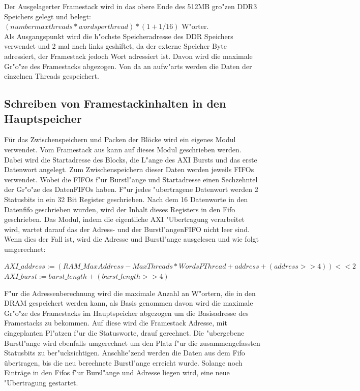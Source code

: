 Der Ausgelagerter Framestack wird in das obere Ende des 512MB gro"zen DDR3 Speichers gelegt und belegt:\\ $(number max threads * words per thread)*(1+1/16) $ W"orter.\\
Als Ausgangspunkt wird die h"ochste Speicheradresse des DDR Speichers verwendet und 2 mal nach links geshiftet, da der externe Speicher Byte adressiert, der Framestack jedoch Wort adressiert ist. Davon wird die maximale Gr"o"ze des Framestacks abgezogen. Von da an aufw"arts werden die Daten der einzelnen Threads gespeichert.

\subsection{Schreiben von Framestackinhalten in den Hauptspeicher}
F\"ur das Zwischenspeichern und Packen der Bl\"ocke wird ein eigenes Modul verwendet.
Vom Framestack aus kann auf dieses Modul geschrieben werden. Dabei wird die Startadresse des Blocks, die L"ange des AXI Bursts und das erste Datenwort angelegt. Zum Zwischenspeichern dieser Daten werden jeweils FIFOs verwendet. Wobei die FIFOs f"ur Burstl"ange und Startadresse einen Sechzehntel der Gr"o{"z}e des DatenFIFOs haben. F"ur jedes "ubertragene Datenwort werden 2 Statusbits in ein 32 Bit Register geschrieben. Nach dem 16 Datenworte in den Datenfifo geschrieben wurden, wird der Inhalt dieses Registers in den Fifo geschrieben. 
Das Modul, indem die eigentliche AXI "Ubertragung verarbeitet wird, wartet darauf das der Adress- und der Burstl"angenFIFO nicht leer sind. Wenn dies der Fall ist, wird die Adresse und Burstl"ange ausgelesen und wie folgt umgerechnet:

$AXI\_address := (RAM\_MaxAddress - MaxThreads*WordsPThread + address +(address >> 4))<<2$\\
$AXI\_burst := burst\_length + (burst\_length >> 4)$

F"ur die Adressenberechnung wird die maximale Anzahl an W"ortern, die in den DRAM gespeichert werden kann, als Basis genommen davon wird die maximale Gr"o"ze des Framestacks im Hauptspeicher abgezogen um die Basisadresse des Framestacks zu bekommen. Auf diese wird die Framestack Adresse, mit eingeplanten Pl"atzen f"ur die Statusworte, drauf gerechnet. 
Die "ubergebene Burstl"ange wird ebenfalls umgerechnet um den Platz f"ur die zusammengefassten Statusbits zu ber"ucksichtigen.
Anschlie"zend werden die Daten aus dem Fifo \"ubertragen, bis die neu berechnete Burstl"ange erreicht wurde. Solange noch Eintr\"age in den Fifos f"ur Bursl"ange und Adresse liegen wird, eine neue "Ubertragung gestartet. 

